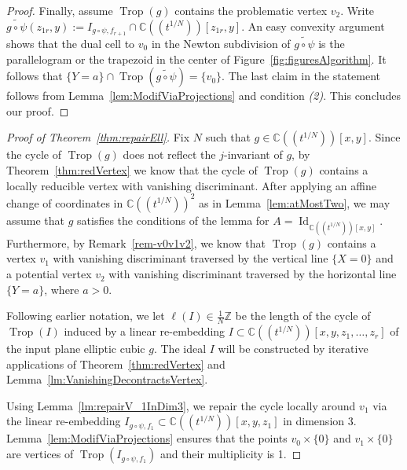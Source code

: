 \documentclass[11pt]{amsart}
\numberwithin{equation}{section}
\theoremstyle{plain}
\theoremstyle{definition}
\theoremstyle{remark}
\begin{document}
\begin{proof}
  Finally, assume $\operatorname{Trop}(g)$ contains the problematic vertex
  $v_2$. Write $\widetilde{g\circ \psi}(z_{1r},y):=
  I_{g\circ\psi,f_{r+1}}\cap {{\mathbb{C}}(\!(t^{1/N})\!)}[z_{1r},y]$.  An easy convexity
  argument shows that the dual cell to $v_0$ in the Newton subdivision
  of $\widetilde{g\circ \psi}$ is the parallelogram or the trapezoid
  in the center of Figure~\ref{fig:figuresAlgorithm}.  It follows that
  $\{Y=a\}\cap \operatorname{Trop}(\widetilde{g \circ \psi}) = \{v_0\}$. The last
  claim in the statement follows from
  Lemma~\ref{lem:ModifViaProjections} and condition \emph{(2)}.  This
  concludes our proof.
\end{proof}

\begin{proof} [Proof of Theorem~\ref{thm:repairEll}] Fix $N$ such that
  $g\in {{\mathbb{C}}(\!(t^{1/N})\!)}[x,y]$.  Since the cycle of $\operatorname{Trop}(g)$ does not reflect
  the $j$-invariant of $g$, by Theorem~\ref{thm:redVertex} we know
  that the cycle of $\operatorname{Trop}(g)$ contains a locally reducible vertex
  with vanishing discriminant. After applying an affine change of
  coordinates in ${{\mathbb{C}}(\!(t^{1/N})\!)}^2$ as in Lemma~\ref{lem:atMostTwo}, we may
  assume that $g$ satisfies the conditions of the lemma for
  $A=\operatorname{Id}_{{{\mathbb{C}}(\!(t^{1/N})\!)}[x,y]}$. Furthermore, by Remark~\ref{rem-v0v1v2}, we
  know that $\operatorname{Trop}(g)$ contains a vertex $v_1$ with vanishing
  discriminant traversed by the vertical line $\{X=0\}$ and a
  potential vertex $v_2$ with vanishing discriminant traversed by the
  horizontal line $\{Y=a\}$, where $a>0$.

  Following earlier notation, we let $\ell(I)\in \frac{1}{N}{\mathbb{Z}}$ be
  the length of the cycle of $\operatorname{Trop}(I)$ induced by a linear
  re-embedding $I\subset {{\mathbb{C}}(\!(t^{1/N})\!)}[x,y,z_1,\ldots,z_r]$ of the input plane
  elliptic cubic $g$. The ideal $I$ will be constructed by iterative
  applications of Theorem~\ref{thm:redVertex} and  Lemma~\ref{lm:VanishingDecontractsVertex}.

  
  Using Lemma~\ref{lm:repairV_1InDim3}, we repair the cycle locally
  around $v_1$ via the linear re-embedding $I_{g\circ
    \psi,f_{1}}\subset {{\mathbb{C}}(\!(t^{1/N})\!)}[x,y,z_{1}]$ in dimension 3.
  Lemma~\ref{lem:ModifViaProjections} ensures that the points
  $v_0\times \{0\}$ and $v_1\times \{0\}$ are vertices of
  $\operatorname{Trop}(I_{g\circ \psi,f_1})$ and their multiplicity is 1.


\end{proof}
\end{document}
